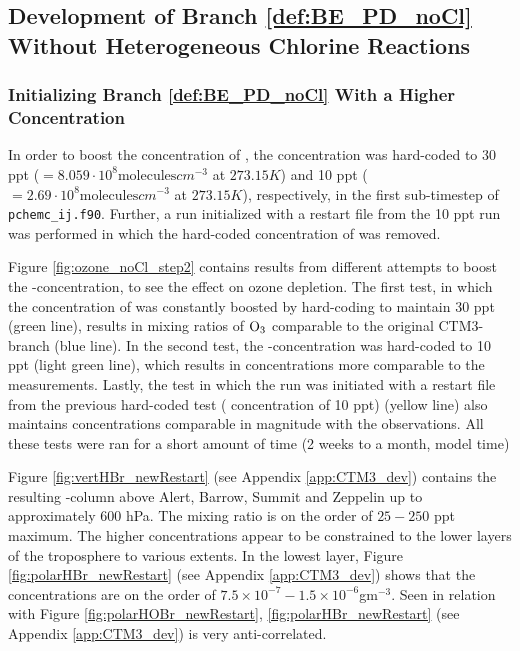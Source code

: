 

%


\subsection{Development of Branch \ref{def:BE_PD_noCl} Without Heterogeneous Chlorine Reactions}\label{sec:res_noHetCl}

\subsubsection{Initializing Branch \ref{def:BE_PD_noCl} With a Higher  Concentration}\label{sec:res_step2}

In order to boost the concentration of , the concentration was hard-coded to 30 ppt ($= 8.059\cdot10^8 \text{molecules}cm^{-3}$ at $273.15 K$) and 10 ppt ($= 2.69\cdot10^8 \text{molecules}cm^{-3}$ at $273.15 K$), respectively, in the first sub-timestep of \texttt{pchemc\_ij.f90}. Further, a run initialized with a restart file from the 10 ppt run was performed in which the hard-coded concentration of  was removed.

\medskip

Figure \ref{fig:ozone_noCl_step2} contains results from different attempts to boost the -concentration, to see the effect on ozone depletion. The first test, in which the concentration of  was constantly boosted by hard-coding to maintain 30 ppt (green line), results in mixing ratios of $\mathrm{O_3}$ comparable to the original CTM3-branch (blue line). In the second test, the -concentration was hard-coded to 10 ppt (light green line), which results in concentrations more comparable to the measurements. Lastly, the test in which the run was initiated with a restart file from the previous hard-coded test ( concentration of 10 ppt) (yellow line) also maintains concentrations comparable in magnitude with the observations. All these tests were ran for a short amount of time (2 weeks to a month, model time)



\medskip

Figure \ref{fig:vertHBr_newRestart} (see Appendix \ref{app:CTM3_dev}) contains the resulting -column above Alert, Barrow, Summit and Zeppelin up to approximately $600$ hPa. The mixing ratio is on the order of $25 - 250$ ppt maximum. The higher concentrations appear to be constrained to the lower layers of the troposphere to various extents. In the lowest layer, Figure \ref{fig:polarHBr_newRestart} (see Appendix \ref{app:CTM3_dev}) shows that the concentrations are on the order of $7.5\times10^{-7} - 1.5\times10^{-6}$gm$^{-3}$. Seen in relation with Figure \ref{fig:polarHOBr_newRestart}, \ref{fig:polarHBr_newRestart} (see Appendix \ref{app:CTM3_dev}) is very anti-correlated. 



